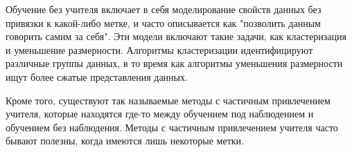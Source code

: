 Обучение без учителя включает в себя моделирование свойств данных без привязки к какой-либо метке, и часто описывается как "позволить данным говорить самим за себя". Эти модели включают такие задачи, как кластеризация и уменьшение размерности. Алгоритмы кластеризации идентифицируют различные группы данных, в то время как алгоритмы уменьшения размерности ищут более сжатые представления данных.


Кроме того, существуют так называемые методы с частичным привлечением учителя, которые находятся где-то между обучением под наблюдением и обучением без наблюдения. Методы с частичным привлечением учителя часто бывают полезны, когда имеются лишь некоторые метки.







